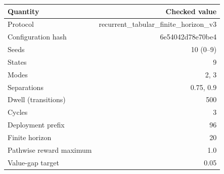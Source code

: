 \begin{tabular}{lr}
\toprule
Quantity & Checked value \\
\midrule
Protocol & recurrent\_tabular\_finite\_horizon\_v3 \\
Configuration hash & 6e54042d78e70be4 \\
Seeds & 10 (0--9) \\
States & 9 \\
Modes & 2, 3 \\
Separations & 0.75, 0.9 \\
Dwell (transitions) & 500 \\
Cycles & 3 \\
Deployment prefix & 96 \\
Finite horizon & 20 \\
Pathwise reward maximum & 1.0 \\
Value-gap target & 0.05 \\
\bottomrule
\end{tabular}
